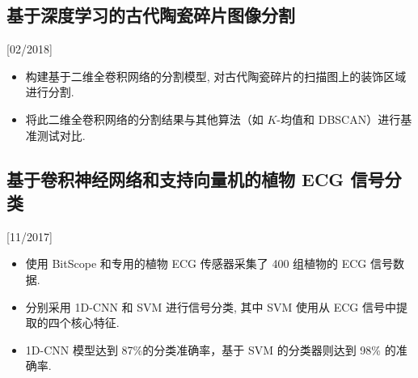 \documentclass{mycv}
\begin{document}
\vspace{-\parskip}

\subsection{基于深度学习的古代陶瓷碎片图像分割}[02/2018]

\begin{itemize}
  \itemsep 0em
  \item 构建基于二维全卷积网络的分割模型, 对古代陶瓷碎片的扫描图上的装饰区域进行分割.
  \item 将此二维全卷积网络的分割结果与其他算法（如 $K$-均值和 DBSCAN）进行基准测试对比.
\end{itemize}

\vspace{-\parskip}

\subsection{基于卷积神经网络和支持向量机的植物 ECG 信号分类}[11/2017]

\begin{itemize}
  \item 使用 BitScope 和专用的植物 ECG 传感器采集了 400 组植物的 ECG 信号数据.
  \item 分别采用 1D-CNN 和 SVM 进行信号分类, 其中 SVM 使用从 ECG 信号中提取的四个核心特征.
  \item 1D-CNN 模型达到 87\%的分类准确率，基于 SVM 的分类器则达到 98\% 的准确率.
\end{itemize}



\end{document}
